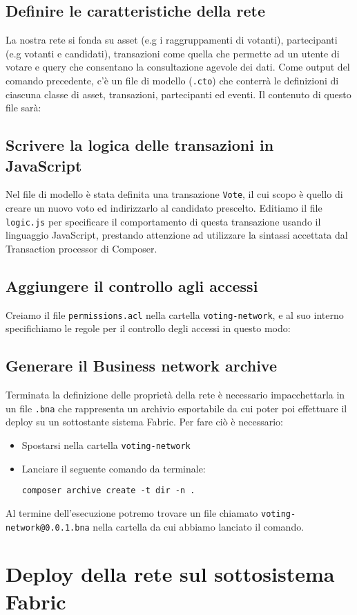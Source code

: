 	\subsection{Definire le caratteristiche della rete}
		La nostra rete si fonda su asset (e.g i raggruppamenti di votanti), partecipanti (e.g votanti e candidati), transazioni come quella che permette ad un utente di votare e query che consentano la consultazione agevole dei dati. Come output del comando precedente, c'è un file di modello (\lstinline{.cto}) che conterrà le definizioni di ciascuna classe di asset, transazioni, partecipanti ed eventi. Il contenuto di questo file sarà:
		

	\subsection{Scrivere la logica delle transazioni in JavaScript}
		Nel file di modello è stata definita una transazione \lstinline{Vote}, il cui scopo è quello di creare un nuovo voto ed indirizzarlo al candidato prescelto. Editiamo il file \lstinline{logic.js} per specificare il comportamento di questa transazione usando il linguaggio JavaScript, prestando attenzione ad utilizzare la sintassi accettata dal Transaction processor di Composer.
		

	\subsection{Aggiungere il controllo agli accessi}
		Creiamo il file \lstinline{permissions.acl} nella cartella \lstinline{voting-network}, e al suo interno specifichiamo le regole per il controllo degli accessi in questo modo:
		

	\subsection{Generare il Business network archive}
		Terminata la definizione delle proprietà della rete è necessario impacchettarla in un file \lstinline{.bna} che rappresenta un archivio esportabile da cui poter poi effettuare il deploy su un sottostante sistema Fabric.
		Per fare ciò è necessario:
		\begin{itemize}
			\item Spostarsi nella cartella \lstinline{voting-network}
			\item Lanciare il seguente comando da terminale:
				\begin{lstlisting}
composer archive create -t dir -n .
				\end{lstlisting}
		\end{itemize}
		Al termine dell'esecuzione potremo trovare un file chiamato \lstinline{voting-network@0.0.1.bna} nella cartella da cui abbiamo lanciato il comando.
		
\section{Deploy della rete sul sottosistema Fabric}